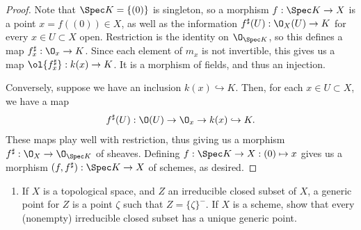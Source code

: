 \documentclass[12pt]{amsart}
\begin{document}
\begin{proof}
  Note that $\Spec K=\{(0)\}$ is singleton, so a morphism $f:\Spec K\to X$ is a point $x=f((0))\in X$, as well as the information $f^\sharp(U): \O_X(U)\to K$ for every $x\in U\subset X$ open.
  Restriction is the identity on $\O_{\Spec K}$, so this defines a map $f^\sharp_x:\O_x\to K$.
  Since each element of $m_x$ is not invertible, this gives us a map $\ol{f^\sharp_x}:k(x)\to K$.
  It is a morphism of fields, and thus an injection.

  Conversely, suppose we have an inclusion $k(x)\hookrightarrow K$.
  Then, for each $x\in U\subset X$, we have a map 
  \[
    f^\sharp(U):\O(U)\to \O_x\to k(x)\hookrightarrow K.
  \]
  These maps play well with restriction, thus giving us a morphism $f^\sharp:\O_X\to \O_{\Spec K}$ of sheaves.
  Defining $f:\Spec K\to X:(0)\mapsto x$ gives us a morphism $(f,f^\sharp):\Spec K\to X$ of schemes, as desired.
\end{proof}


\begin{enumerate}
  \item[2.9.] {
      If $X$ is a topological space, and $Z$ an irreducible closed subset of $X$, a generic point for $Z$ is a point $\zeta$ such that $Z=\{\zeta\}^-$.
      If $X$ is a scheme, show that every (nonempty) irreducible closed subset has a unique generic point.
    }
\end{enumerate}
\end{document}
